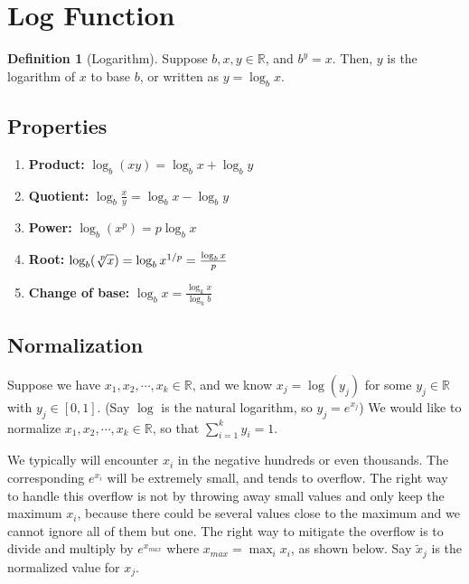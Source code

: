 \documentclass[11pt]{article}
\title{}
\theoremstyle{definition}
\newtheorem{definition}{Definition}[section]
\newcommand{\myroot}[2]{\sqrt[\leftroot{-2}\uproot{2}#1]{#2}}
\begin{document}
\pagestyle{fancy}
\fancyhf{} %
\cfoot{\thepage}
\renewcommand{\headrulewidth}{1pt}

\section{Log Function}

\begin{definition}[Logarithm]
  Suppose $b,x,y\in\mathbb{R}$, and $b^y=x$. Then, $y$ is the logarithm of $x$ to base $b$,
  or written as $y=\log_bx$.
\end{definition}

\subsection{Properties}
\begin{enumerate}
\item \textbf{Product:} $\log_b(xy)=\log_bx + \log_by$
\item \textbf{Quotient:} $\log_b\frac{x}{y}=\log_bx - \log_by$
\item \textbf{Power:} $\log_b(x^p)=p\log_bx$
\item \textbf{Root:} $\log_b(\myroot{p}{x})=\log_b{x^{1/p}}=\frac{\log_bx}{p}$
\item \textbf{Change of base:} $\log_bx=\frac{\log_kx}{\log_kb}$
\end{enumerate}

\subsection{Normalization}
Suppose we have $x_1,x_2,\cdots,x_k\in\mathbb{R}$, and we know $x_j=\log(y_j)$ for some $y_j\in\mathbb{R}$ with $y_j\in[0,1]$. (Say $\log$ is the natural logarithm, so $y_j=e^{x_j}$) We would like to normalize $x_1,x_2,\cdots,x_k\in\mathbb{R}$, so that $\sum_{i=1}^ky_i=1$.

We typically will encounter $x_i$ in the negative hundreds or even thousands. The corresponding $e^{x_i}$ will be extremely small, and tends to overflow. The right way to handle this overflow is not by throwing away small values and only keep the maximum $x_i$, because there could be several values close to the maximum and we cannot ignore all of them but one. The right way to mitigate the overflow is to divide and multiply by $e^{x_{max}}$ where $x_{max}=\max_ix_i$, as shown below. Say $\tilde{x}_j$ is the normalized value for $x_j$.
\end{document}
